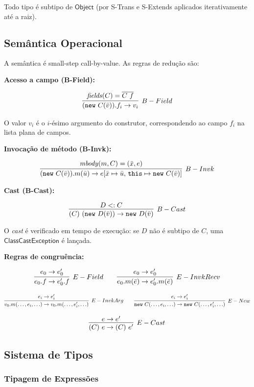 Todo tipo é subtipo de \(\mathsf{Object}\) (por S-Trans e S-Extends
aplicados iterativamente até a raiz).

\subsection{Semântica Operacional}

A semântica é small-step call-by-value. As regras de redução são:

\textbf{Acesso a campo (B-Field):}

\[ \infer[B-Field]{(\mathtt{new}\ C(\bar{v})).f_i \to v_i}{\mathit{fields}(C) =
\overline{C\ f}} \]

O valor \(v_i\) é o \(i\)-ésimo argumento do construtor,
correspondendo ao campo \(f_i\) na lista plana de campos.

\textbf{Invocação de método (B-Invk):}

\[ \infer[B-Invk]{(\mathtt{new}\ C(\bar{v})).m(\bar{u}) \to e[\bar{x} \mapsto
      \bar{u},\, \mathtt{this} \mapsto
  \mathtt{new}\ C(\bar{v})]}{\mathit{mbody}(m, C)
= (\bar{x}, e)} \]

\textbf{Cast (B-Cast):}

\[ \infer[B-Cast]{(C)\ (\mathtt{new}\ D(\bar{v})) \to \mathtt{new}\
D(\bar{v})}{D <: C} \]

O \emph{cast} é verificado em tempo de execução: se \(D\) não é
subtipo de \(C\), uma \(\mathsf{ClassCastException}\) é lançada.

\textbf{Regras de congruência:}

\[ \infer[E-Field]{e_0.f \to e_0'.f}{e_0 \to e_0'} \qquad
\infer[E-InvkRecv]{e_0.m(\bar{e}) \to e_0'.m(\bar{e})}{e_0 \to e_0'} \]

\[ \infer[E-InvkArg]{v_0.m(\ldots, e_i, \ldots) \to v_0.m(\ldots, e_i',
  \ldots)}{e_i \to e_i'} \qquad \infer[E-New]{\mathtt{new}\ C(\ldots,
    e_i, \ldots)
\to \mathtt{new}\ C(\ldots, e_i', \ldots)}{e_i \to e_i'} \]

\[ \infer[E-Cast]{(C)\ e \to (C)\ e'}{e \to e'} \]

\subsection{Sistema de Tipos}

\subsubsection{Tipagem de Expressões}

